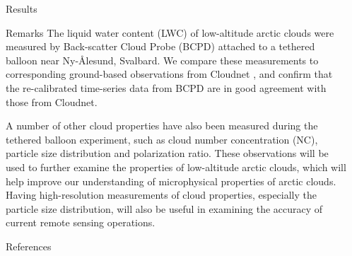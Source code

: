 \documentclass[final]{beamer}
\newlength{\sepwidth}
\newlength{\colwidth}
\newcommand{\separatorcolumn}{\begin{column}{\sepwidth}\end{column}}
\begin{document}
\begin{frame}[t]
\begin{columns}[t]
\begin{column}{\colwidth}
\begin{alertblock}{Results}
      \end{alertblock}

      \begin{block}{Remarks}
        The liquid water content (LWC) of low-altitude arctic clouds were measured by Back-scatter Cloud Probe (BCPD) \cite{baumgardner2014ice, thomson2014compact} attached to a tethered balloon near Ny-\r{A}lesund, Svalbard. We compare these measurements to corresponding ground-based observations from Cloudnet \cite{illingworth2007cloudnet}, and confirm that the re-calibrated time-series data from BCPD are in good agreement with those from Cloudnet.

        A number of other cloud properties have also been measured during the tethered balloon experiment, such as cloud number concentration (NC), particle size distribution and polarization ratio. These observations will be used to further examine the properties of low-altitude arctic clouds, which will help improve our understanding of microphysical properties of arctic clouds. Having high-resolution measurements of cloud properties, especially the particle size distribution, will also be useful in examining the accuracy of current remote sensing operations.
      \end{block}

      \begin{block}{References}

        \nocite{*}
        \footnotesize{}

      \end{block}

    \end{column}

    \separatorcolumn
  \end{columns}
\end{frame}
\end{document}
